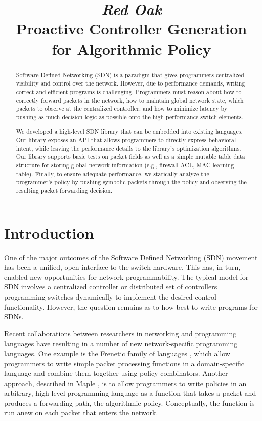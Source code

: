 \documentclass[preprint]{sigplanconf}
\title{\textit{Red Oak}\\ Proactive Controller Generation for Algorithmic Policy}
\begin{document}
\maketitle


\begin{abstract}
Software Defined Networking (SDN) is a paradigm that gives programmers 
centralized visibility and control over the network. However, due to performance 
demands, writing correct and efficient programs is challenging. Programmers must 
reason about how to correctly forward packets in the network, how to maintain
global network state, which packets to observe at the centralized controller, 
and how to minimize latency by pushing as much decision logic
as possible onto the high-performance switch elements.

We developed a high-level SDN library that can be embedded into existing languages.
Our library exposes an API that allows programmers to directly express behavioral intent, 
while leaving the performance details to the library's optimization algorithms.
Our library supports basic tests on packet fields as well as a simple mutable table
data structure for storing global network information (e.g., firewall ACL, MAC learning table).
Finally, to ensure adequate performance, 
we statically analyze the programmer's policy by pushing symbolic packets through the policy 
and observing the resulting packet forwarding decision.
\end{abstract}


\section*{Introduction}

One of the major outcomes of the Software Defined Networking (SDN) movement has been a unified, open interface to the switch hardware. This has, in turn, enabled new opportunities for network programmability. The typical model for SDN involves a centralized controller or distributed set of controllers programming switches dynamically to implement the desired control functionality.
However, the question remains as to how best to write programs for SDNs.

Recent collaborations between researchers in networking and programming languages have resulting in a number of new network-specific programming languages. One example is the Frenetic family of languages \cite{Frenetic}, which allow programmers to write simple packet processing functions in a domain-specific language and combine them together using policy combinators. Another approach, described in Maple \cite{Maple}, is to allow programmers to write policies in an arbitrary, high-level programming language as a function that takes a packet and produces a forwarding path, the algorithmic policy. Conceptually, the function is run anew on each packet that enters the network.
\end{document}
